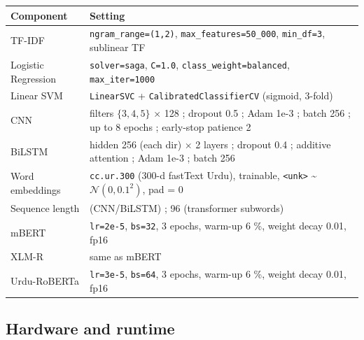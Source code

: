 \documentclass[
  english,
  11pt,
]{article}
\newcounter{none} %
\begin{document}
{\def\LTcaptype{none} %
\begin{longtable}[]{@{}
  >{\raggedright\arraybackslash}p{}
  >{\raggedright\arraybackslash}p{}@{}}
\toprule\noalign{}
\begin{minipage}[b]{\linewidth}\raggedright
Component
\end{minipage} & \begin{minipage}[b]{\linewidth}\raggedright
Setting
\end{minipage} \\
\midrule\noalign{}
\endhead
\bottomrule\noalign{}
\endlastfoot
TF-IDF & \texttt{ngram\_range=(1,2)}, \texttt{max\_features=50\_000},
\texttt{min\_df=3}, sublinear TF \\
Logistic Regression & \texttt{solver=saga}, \texttt{C=1.0},
\texttt{class\_weight=balanced}, \texttt{max\_iter=1000} \\
Linear SVM & \texttt{LinearSVC} + \texttt{CalibratedClassifierCV}
(sigmoid, 3-fold) \\
CNN & filters \(\{3,4,5\}\) $\times$ 128 ; dropout 0.5 ; Adam 1e-3 ; batch 256
; up to 8 epochs ; early-stop patience 2 \\
BiLSTM & hidden 256 (each dir) $\times$ 2 layers ; dropout 0.4 ; additive
attention ; Adam 1e-3 ; batch 256 \\
Word embeddings & \texttt{cc.ur.300} (300-d fastText Urdu), trainable,
\texttt{\textless{}unk\textgreater{}} \textasciitilde{}
\(\mathcal{N}(0, 0.1^2)\), pad = 0 \\
Sequence length & 64 (CNN/BiLSTM) ; 96 (transformer subwords) \\
mBERT & \texttt{lr=2e-5}, \texttt{bs=32}, 3 epochs, warm-up 6 \%, weight
decay 0.01, fp16 \\
XLM-R & same as mBERT \\
Urdu-RoBERTa & \texttt{lr=3e-5}, \texttt{bs=64}, 3 epochs, warm-up 6 \%,
weight decay 0.01, fp16 \\
\end{longtable}
}

\subsection{Hardware and runtime}\label{hardware-and-runtime}
\end{document}
